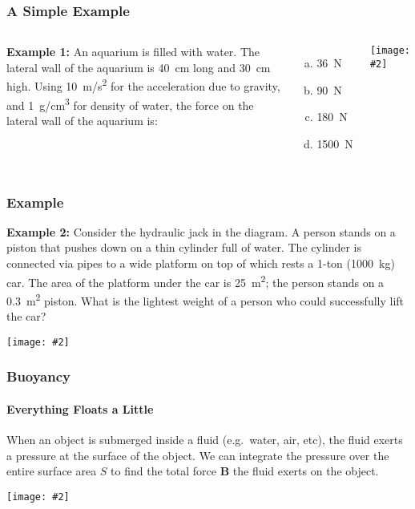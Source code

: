 \documentclass[12pt,aspectratio=169]{beamer}
\newcommand{\pic}[2]{\texttt{[image: \#2]}}
\newcommand{\mb}[1]{\mathbf{#1}}
\begin{document}
\begin{frame}
  \frametitle{A Simple Example}
  \begin{columns}

    \textbf{Example 1:} An aquarium is filled with water. The lateral wall of
    the aquarium is \SI{40}{cm} long and \SI{30}{cm} high. Using \SI{10}{m/s^2}
    for the acceleration due to gravity, and \SI{1}{g/cm^3} for density of
    water, the force on the lateral wall of the aquarium is:
    \begin{enumerate}[(a)]
    \item\SI{36}{N}
    \item\SI{90}{N}
    \item\SI{180}{N}
    \item\SI{1500}{N}
    \end{enumerate}

    \pic{1}{home-fish-tank.jpg}
  \end{columns}
\end{frame}



\begin{frame}
  \frametitle{Example}
  \textbf{Example 2:} Consider the hydraulic jack in the diagram. A person
  stands on a piston that pushes down on a thin cylinder full of water. The
  cylinder is connected via pipes to a wide platform on top of which rests a
  1-ton (\SI{1000}{kg}) car. The area of the platform under the car is
  \SI{25}{m^2}; the person stands on a \SI{0.3}{m^2} piston. What is the
  lightest weight of a person who could successfully lift the car?
  \begin{center}
    \vspace{-.2in}
    \pic{.4}{jack.png}
    
  \end{center}
\end{frame}



\begin{frame}
  \frametitle{Buoyancy}
  \framesubtitle{Everything Floats a Little}
  When an object is submerged inside a fluid (e.g.\ water, air, etc), the fluid
  exerts a pressure at the surface of the object. We can integrate the pressure
  over the entire surface area $S$ to find the total force $\mb{B}$ the fluid
  exerts on the object.
  \begin{center}
    \pic{.35}{rock_fbvectors.jpg}
  \end{center}
\end{frame}
\end{document}
